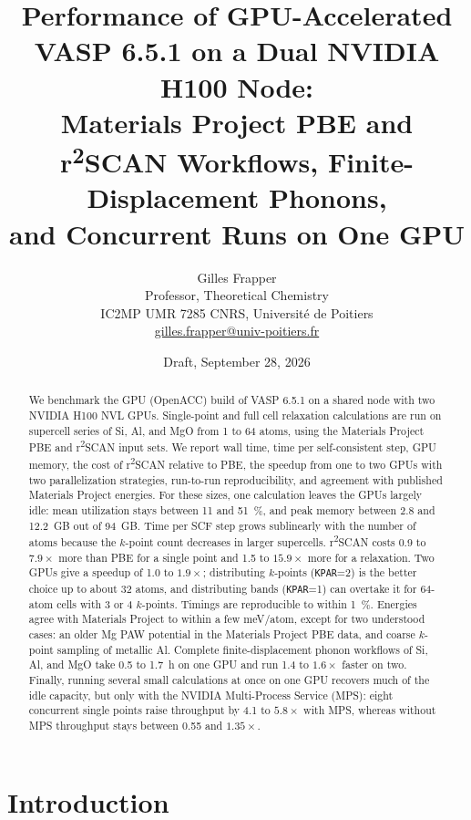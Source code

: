 \documentclass[11pt,letterpaper]{article}
\title{Performance of GPU-Accelerated VASP 6.5.1 on a Dual NVIDIA H100 Node:\\
Materials Project PBE and r\textsuperscript{2}SCAN Workflows, Finite-Displacement Phonons,\\
and Concurrent Runs on One GPU}
\author{Gilles Frapper \\ Professor, Theoretical Chemistry \\ IC2MP UMR 7285 CNRS, Universit\'e de Poitiers \\ \href{mailto:gilles.frapper@univ-poitiers.fr}{gilles.frapper@univ-poitiers.fr}}
\date{Draft, September 28, 2026}
\begin{document}
\maketitle

\begin{abstract}
We benchmark the GPU (OpenACC) build of VASP 6.5.1 on a shared node with two NVIDIA H100 NVL
GPUs. Single-point and full cell relaxation calculations are run on supercell series of Si, Al,
and MgO from 1 to 64 atoms, using the Materials Project PBE and r\textsuperscript{2}SCAN input
sets. We report wall time, time per self-consistent step, GPU memory, the cost of
r\textsuperscript{2}SCAN relative to PBE, the speedup from one to two GPUs with two
parallelization strategies, run-to-run reproducibility, and agreement with published Materials
Project energies. For these sizes, one calculation leaves the GPUs largely idle: mean
utilization stays between 11 and \SI{51}{\percent}, and peak memory between 2.8 and
\SI{12.2}{GB} out of \SI{94}{GB}. Time per SCF step grows sublinearly with the number of atoms
because the $k$-point count decreases in larger supercells. r\textsuperscript{2}SCAN costs
0.9 to $7.9\times$ more than PBE for a single point and 1.5 to $15.9\times$ more for a
relaxation. Two GPUs give a speedup of 1.0 to $1.9\times$; distributing $k$-points
(\texttt{KPAR}=2) is the better choice up to about 32 atoms, and distributing bands
(\texttt{KPAR}=1) can overtake it for 64-atom cells with 3 or 4 $k$-points. Timings are
reproducible to within \SI{1}{\percent}. Energies agree with Materials Project to within a few
meV/atom, except for two understood cases: an older Mg PAW potential in the Materials Project
PBE data, and coarse $k$-point sampling of metallic Al. Complete finite-displacement phonon
workflows of Si, Al, and MgO take 0.5 to \SI{1.7}{h} on one GPU and run 1.4 to $1.6\times$ faster on
two. Finally, running several small calculations at once on one GPU recovers much of the idle
capacity, but only with the NVIDIA Multi-Process Service (MPS): eight concurrent single points
raise throughput by 4.1 to $5.8\times$ with MPS, whereas without MPS throughput stays between
0.55 and $1.35\times$.
\end{abstract}

\section{Introduction}
\label{sec:intro}
\end{document}
